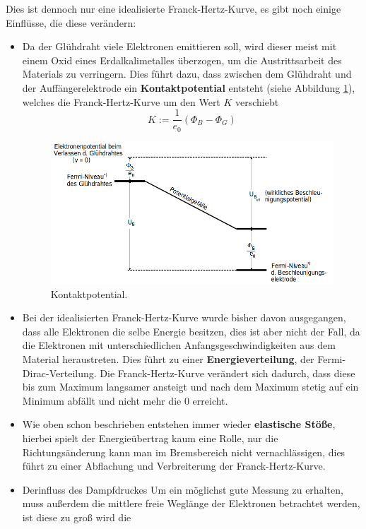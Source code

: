 Dies ist dennoch nur eine idealisierte Franck-Hertz-Kurve, es gibt noch einige Einflüsse, die diese verändern:
\begin{itemize}
\item Da der Glühdraht viele Elektronen emittieren soll, wird dieser meist mit einem Oxid eines Erdalkalimetalles überzogen, um die Austrittsarbeit des
Materials zu verringern. Dies führt dazu, dass zwischen dem Glühdraht und der Auffängerelektrode ein \textbf{Kontaktpotential} entsteht (siehe Abbildung \ref{abb:3}),
welches die Franck-Hertz-Kurve um den Wert $K$ verschiebt
\begin{equation}
  K := \frac{1}{e_0}(\Phi_B - \Phi_G)
\end{equation}
\begin{figure}
  \centering
  \includegraphics[scale=0.4]{Kontaktpotential.png}
  \caption{Kontaktpotential.\cite{Q1}}
  \label{abb:3}
\end{figure}
\item Bei der idealisierten Franck-Hertz-Kurve wurde bisher davon ausgegangen, dass alle Elektronen die selbe Energie besitzen, dies ist aber nicht der Fall,
da die Elektronen mit unterschiedlichen Anfangsgeschwindigkeiten aus dem Material heraustreten. Dies führt zu einer \textbf{Energieverteilung}, der
Fermi-Dirac-Verteilung. Die Franck-Hertz-Kurve verändert sich dadurch, dass diese bis zum Maximum langsamer ansteigt und nach dem Maximum stetig auf ein
Minimum abfällt und nicht mehr die 0 erreicht.
\item Wie oben schon beschrieben entstehen immer wieder \textbf{elastische Stöße}, hierbei spielt der Energieübertrag kaum eine Rolle, nur die Richtungsänderung
kann man im Bremsbereich nicht vernachlässigen, dies führt zu einer Abflachung und Verbreiterung der Franck-Hertz-Kurve.
\item Derinfluss des Dampfdruckes
Um ein möglichst gute Messung zu erhalten, muss außerdem die mittlere freie Weglänge der Elektronen betrachtet werden, ist diese zu groß wird die

\end{itemize}
